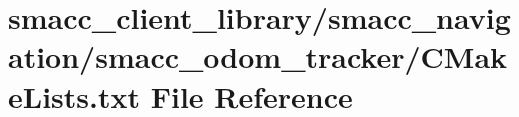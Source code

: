 \hypertarget{smacc__client__library_2smacc__navigation_2smacc__odom__tracker_2CMakeLists_8txt}{}\section{smacc\+\_\+client\+\_\+library/smacc\+\_\+navigation/smacc\+\_\+odom\+\_\+tracker/\+C\+Make\+Lists.txt File Reference}
\label{smacc__client__library_2smacc__navigation_2smacc__odom__tracker_2CMakeLists_8txt}
